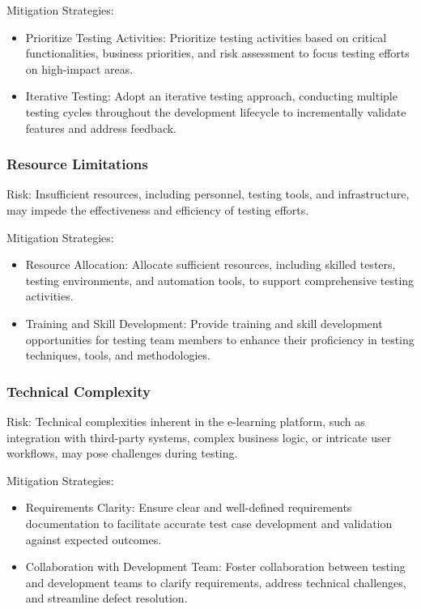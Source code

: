 		Mitigation Strategies:
		
		\begin{itemize}
			\item Prioritize Testing Activities: Prioritize testing activities based on critical functionalities, business priorities, and risk assessment to focus testing efforts on high-impact areas.
			\item Iterative Testing: Adopt an iterative testing approach, conducting multiple testing cycles throughout the development lifecycle to incrementally validate features and address feedback.
		\end{itemize}
		
		\subsubsection{Resource Limitations}
		
		Risk: Insufficient resources, including personnel, testing tools, and infrastructure, may impede the effectiveness and efficiency of testing efforts.
		
		Mitigation Strategies:
		
		\begin{itemize}
			\item Resource Allocation: Allocate sufficient resources, including skilled testers, testing environments, and automation tools, to support comprehensive testing activities.
			\item Training and Skill Development: Provide training and skill development opportunities for testing team members to enhance their proficiency in testing techniques, tools, and methodologies.
		\end{itemize}
		
		\subsubsection{Technical Complexity}
		
		Risk: Technical complexities inherent in the e-learning platform, such as integration with third-party systems, complex business logic, or intricate user workflows, may pose challenges during testing.
		
		Mitigation Strategies:
		
		\begin{itemize}
			\item Requirements Clarity: Ensure clear and well-defined requirements documentation to facilitate accurate test case development and validation against expected outcomes.
			\item Collaboration with Development Team: Foster collaboration between testing and development teams to clarify requirements, address technical challenges, and streamline defect resolution.
		\end{itemize}
		
